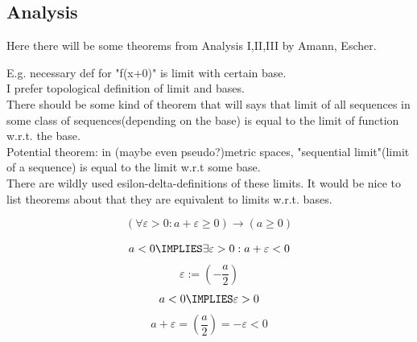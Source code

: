 \def\topic{Analysis}


\subsection{Analysis}
Here there will be some theorems from Analysis I,II,III by Amann, Escher.

E.g. necessary def for "f(x+0)" is limit with certain base.\\
I prefer topological definition of limit and bases.\\
There should be some kind of theorem that will says that limit of all sequences in some class of sequences(depending on the base) is equal to the limit of function w.r.t. the base.\\
Potential theorem: in (maybe even pseudo?)metric spaces, "sequential limit"(limit of a sequence) is equal to the limit w.r.t some base.\\
There are wildly used esilon-delta-definitions of these limits. It would be nice to list theorems about that they are equivalent to limits w.r.t. bases.\\


\begin{theorem}
\[
(\forall \varepsilon >0: a+\varepsilon \geqslant 0) \to (a \geqslant 0)
\]
\end{theorem}
\Proof
\[
a<0
\IMPLIES
\exists \varepsilon > 0 : a+\varepsilon < 0
\]
\[
\varepsilon := \left(-\frac{a}{2}\right)
\]
\[
a<0
\IMPLIES
\varepsilon > 0
\]
\[
a+\varepsilon = \left(\frac{a}{2}\right) = -\varepsilon < 0
\]

\Done

